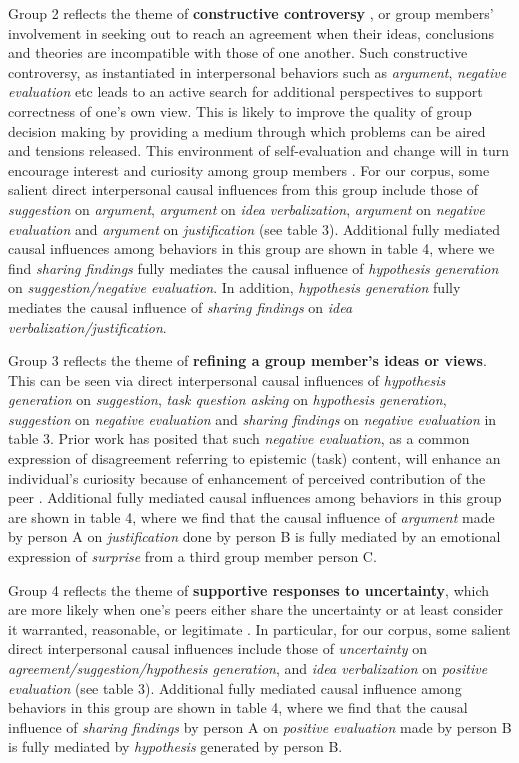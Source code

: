 \documentclass{llncs}
\begin{document}
Group 2 reflects the theme of {\bf constructive controversy} \cite{johnson2009energizing}, or group members' involvement in seeking out to reach an agreement when their ideas, conclusions and theories are incompatible with those of one another. Such constructive controversy, as instantiated in interpersonal behaviors such as {\em argument}, {\em negative evaluation} etc leads to an active search for additional perspectives to support correctness of one's own view. This is likely to improve the quality of group decision making by providing a medium through which problems can be aired and tensions released. This environment of self-evaluation and change will in turn encourage interest and curiosity among group members \cite{paletz2011intragroup}. For our corpus, some salient direct interpersonal causal influences from this group include those of {\em suggestion} on {\em argument}, {\em argument} on {\em idea verbalization}, {\em argument} on {\em negative evaluation} and {\em argument} on {\em justification} (see table 3). Additional fully mediated causal influences among behaviors in this group are shown in table 4, where we find {\em sharing findings} fully mediates the causal influence of {\em hypothesis generation} on {\em suggestion/negative evaluation}. In addition, {\em hypothesis generation} fully mediates the causal influence of {\em sharing findings} on {\em idea verbalization/justification}.

Group 3 reflects the theme of {\bf refining a group member's ideas or views}. This can be seen via direct interpersonal causal influences of {\em hypothesis generation} on {\em suggestion}, {\em task question asking} on {\em hypothesis generation}, {\em suggestion} on {\em negative evaluation} and {\em sharing findings} on {\em negative evaluation} in table 3. Prior work has posited that such {\em negative evaluation}, as a common expression of disagreement referring to epistemic (task) content, will enhance an individual's curiosity because of enhancement of perceived contribution of the peer \cite{darnon2007dealing}. Additional fully mediated causal influences among behaviors in this group are shown in table 4, where we find that the causal influence of {\em argument} made by person A on {\em justification} done by person B is fully mediated by an emotional expression of {\em surprise} from a third group member person C.

Group 4 reflects the theme of {\bf supportive responses to uncertainty}, which are more likely when one's peers either share the uncertainty or at least consider it warranted, reasonable, or legitimate \cite{jordan2014managing}. In particular, for our corpus, some salient direct interpersonal causal influences include those of {\em uncertainty} on {\em agreement/suggestion/hypothesis generation}, and {\em idea verbalization} on {\em positive evaluation} (see table 3). Additional fully mediated causal influence among behaviors in this group are shown in table 4, where we find that the causal influence of {\em sharing findings} by person A on {\em positive evaluation} made by person B is fully mediated by {\em hypothesis} generated by person B.
\vspace{-0.43cm}
\end{document}
